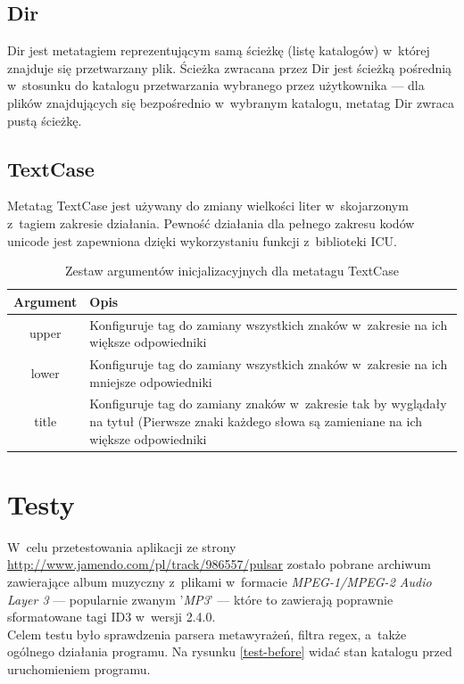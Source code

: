 \subsection{Dir}
Dir jest metatagiem reprezentującym samą ścieżkę (listę katalogów) w~której znajduje się przetwarzany plik. Ścieżka zwracana przez Dir jest ścieżką pośrednią w~stosunku do katalogu przetwarzania wybranego przez użytkownika --- dla plików znajdujących się bezpośrednio w~wybranym katalogu, metatag Dir zwraca pustą ścieżkę.

\subsection{TextCase}
Metatag TextCase jest używany do zmiany wielkości liter w~skojarzonym z~tagiem zakresie działania. Pewność działania dla pełnego zakresu kodów unicode jest zapewniona dzięki wykorzystaniu funkcji z~biblioteki ICU.



\begin{table}[h]
\begin{center}
\begin{tabular}{| c | p{13cm} |}
\hline
\textbf{Argument} & \textbf{Opis} \\
\hline
upper & Konfiguruje tag do zamiany wszystkich znaków w~zakresie na ich większe odpowiedniki \\
lower & Konfiguruje tag do zamiany wszystkich znaków w~zakresie na ich mniejsze odpowiedniki \\
title & Konfiguruje tag do zamiany znaków w~zakresie tak by wyglądały na tytuł (Pierwsze znaki każdego słowa są zamieniane na ich większe odpowiedniki \\
\hline
\end{tabular} \end{center}
\caption{Zestaw argumentów inicjalizacyjnych dla metatagu TextCase}
\end{table}

\section{Testy}
\label{testy}

\par
 W~celu przetestowania aplikacji ze strony \url{http://www.jamendo.com/pl/track/986557/pulsar} zostało pobrane archiwum zawierające album muzyczny z~plikami w~formacie \textit{MPEG-1/MPEG-2 Audio Layer 3} --- popularnie zwanym '\textit{MP3}' --- które to zawierają poprawnie sformatowane tagi ID3 w~wersji 2.4.0.\\
Celem testu było sprawdzenia parsera metawyrażeń, filtra regex, a~także ogólnego działania programu.
Na rysunku \ref{test-before} widać stan katalogu przed uruchomieniem programu.

